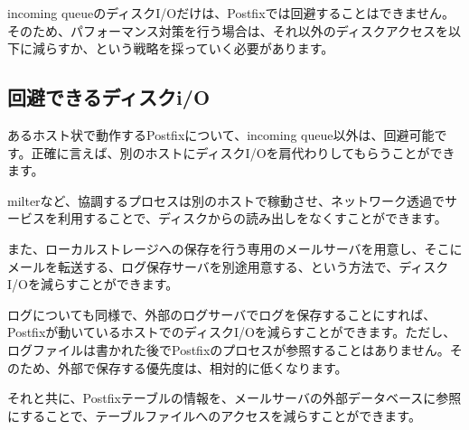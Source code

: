 incoming queueのディスクI/Oだけは、Postfixでは回避することはできません。そのため、パフォーマンス対策を行う場合は、それ以外のディスクアクセスを以下に減らすか、という戦略を採っていく必要があります。

\subsection{回避できるディスクi/O}

あるホスト状で動作するPostfixについて、incoming queue以外は、回避可能です。正確に言えば、別のホストにディスクI/Oを肩代わりしてもらうことができます。

milterなど、協調するプロセスは別のホストで稼動させ、ネットワーク透過でサービスを利用することで、ディスクからの読み出しをなくすことができます。

また、ローカルストレージへの保存を行う専用のメールサーバを用意し、そこにメールを転送する、ログ保存サーバを別途用意する、という方法で、ディスクI/Oを減らすことができます。

ログについても同様で、外部のログサーバでログを保存することにすれば、Postfixが動いているホストでのディスクI/Oを減らすことができます。ただし、ログファイルは書かれた後でPostfixのプロセスが参照することはありません。そのため、外部で保存する優先度は、相対的に低くなります。

それと共に、Postfixテーブルの情報を、メールサーバの外部データベースに参照にすることで、テーブルファイルへのアクセスを減らすことができます。
